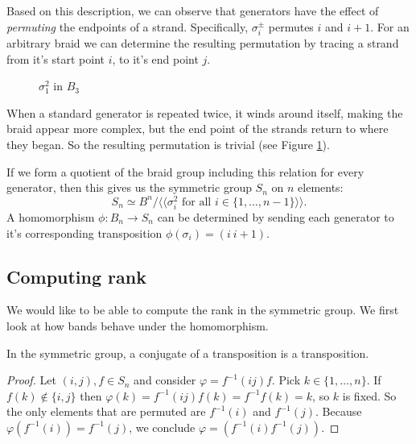 \documentclass[12pt]{thesis}
\begin{document}
Based on this description, we can observe that generators
have the effect of \textit{permuting} the endpoints of a strand.
Specifically, $\sigma_{i}^{\pm}$ permutes $i$ and $i+1$.
For an arbitrary braid we can determine
the resulting permutation by tracing a strand from it's start point $i$, to it's end point $j$.

\begin{figure}[h]
    \centering
    \def\svgwidth{4cm}
    
    \caption{$\sigma_{1}^{2}$ in $B_{3}$}
    \label{fig:generator-squared}
\end{figure}

When a standard generator is repeated twice, it winds around
itself, making the braid appear more complex,
but the end point of the strands return to where they began.
So the resulting  permutation is trivial
(see Figure \ref{fig:generator-squared}).

If we form a quotient of the braid group including this relation for every generator, then this gives us the symmetric
group $S_{n}$ on $n$ elements:
\begin{equation}
S_{n} \simeq B^{n} / \langle \langle \sigma_{i}^{2} \text{ for all } i \in \{ 1, \ldots, n-1 \}  \rangle \rangle.
\end{equation}
A homomorphism $\phi \colon B_{n} \rightarrow S_{n}$ can be determined by 
sending each generator to it's corresponding transposition $\phi(\sigma_{i}) = (i\ i+1)$.

\subsection{Computing rank}

We would like to be able to compute the rank in the symmetric
group. We first look at how bands behave under the homomorphism.

\begin{lemma}
    In the symmetric group, a conjugate of a transposition is a transposition.
\end{lemma}

\begin{proof}
    Let $(i,j), f \in S_{n}$ and consider $\varphi = f^{-1}(i j)f$.
    Pick $k \in \{ 1, \ldots, n \}$. 
    If $f(k) \not \in \{ i, j \}$
    then $\varphi(k) = f^{-1}(i j)f(k) = f^{-1}f(k) = k$,
    so $k$ is fixed.
    So the only elements that are permuted
    are $f^{-1}(i)$ and $f^{-1}(j)$.
    Because $\varphi(f^{-1}(i)) = f^{-1}(j)$,
    we conclude $\varphi = (f^{-1}(i) f^{-1}(j))$.
\end{proof}
\end{document}
